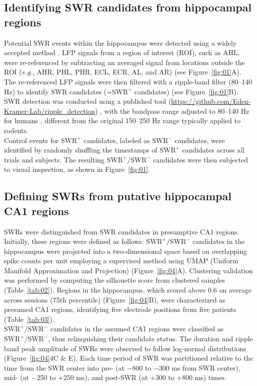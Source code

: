 \documentclass[final,3p,times,twocolumn]{elsarticle}
\begin{document}
\subsection{Identifying SWR candidates from hippocampal regions}
Potential SWR events within the hippocampus were detected using a widely accepted method \cite{liu_consensus_2022}. LFP signals from a region of interest (ROI), such as AHL, were re-referenced by subtracting an averaged signal from locations outside the ROI (\textit{e.g.}, AHR, PHL, PHR, ECL, ECR, AL, and AR) (see Figure~\ref{fig:01}A). The re-referenced LFP signals were then filtered with a ripple-band filter (80--140 Hz) to identify SWR candidates (=$\textrm{SWR}^+$ candidates) (see Figure~\ref{fig:01}B). SWR detection was conducted using a published tool (\url{https://github.com/Eden-Kramer-Lab/ripple_detection}) \cite{kay_hippocampal_2016}, with the bandpass range adjusted to 80--140 Hz for humans \cite{norman_hippocampal_2019} \cite{norman_hippocampal_2021}, different from the original 150--250 Hz range typically applied to rodents.
\\
\indent
Control events for $\textrm{SWR}^+$ candidates, labeled as $\textrm{SWR}^-$ candidates, were identified by randomly shuffling the timestamps of $\textrm{SWR}^+$ candidates across all trials and subjects. The resulting $\textrm{SWR}^+/\textrm{SWR}^-$ candidates were then subjected to visual inspection, as shown in Figure~\ref{fig:01}.

\subsection{Defining SWRs from putative hippocampal CA1 regions}
SWRs were distinguished from SWR candidates in presumptive CA1 regions. Initially, these regions were defined as follows: $\textrm{SWR}^+/\textrm{SWR}^-$ candidates in the hippocampus were projected into a two-dimensional space based on overlapping spike counts per unit employing a supervised method using UMAP (Uniform Manifold Approximation and Projection) \cite{mcinnes_umap_2018} (Figure~\ref{fig:04}A). Clustering validation was performed by computing the silhouette score \cite{rousseeuw_silhouettes_1987} from clustered samples (Table~\ref{tab:02}). Regions in the hippocampus, which scored above 0.6 on average across sessions (75th percentile) (Figure~\ref{fig:04}B), were characterized as presumed CA1 regions, identifying five electrode positions from five patients (Table~\ref{tab:03}).
\\
\indent
$\textrm{SWR}^+/\textrm{SWR}^-$ candidates in the assumed CA1 regions were classified as $\textrm{SWR}^+/\textrm{SWR}^-$, thus relinquishing their candidate status. The duration and ripple band peak amplitude of SWRs were observed to follow log-normal distributions (Figure~\ref{fig:04}4C \& E). Each time period of SWR was partitioned relative to the time from the SWR center into pre- (at $-800$ to $-300$ ms from SWR center), mid- (at $-250$ to $+250$ ms), and post-SWR (at $+300$ to $+800$ ms) times.
\end{document}
